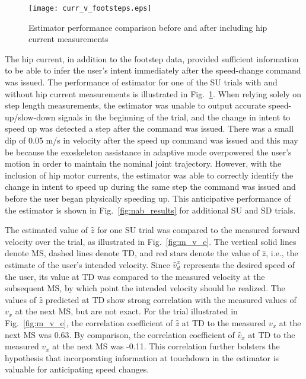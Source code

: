 \begin{figure}
	\centering
	\texttt{[image: curr\_v\_footsteps.eps]}
	\caption{Estimator performance comparison before and after including hip current measurements} \label{fig:c_v_f}
\end{figure}

The hip current, in addition to the footstep data, provided sufficient information to be able to infer the user's intent immediately after the speed-change command was issued.
The performance of estimator for one of the SU trials with and without hip current measurements is illustrated in Fig.~\ref{fig:c_v_f}. When relying solely on step length measurements, the estimator was unable to output accurate speed-up/slow-down signals in the beginning of the trial, and the change in intent to speed up was detected a step after the command was issued. There was a small dip of 0.05 m/s in velocity after the speed up command was issued and this may be because the exoskeleton assistance in adaptive mode overpowered the user's motion in order to maintain the nominal joint trajectory. However, with the inclusion of hip motor currents, the estimator was able to correctly identify the change in intent to speed up during the same step the command was issued and before the user began physically speeding up. This anticipative performance of the estimator is shown in Fig.~\ref{fig:nab_results} for additional SU and SD trials. 

The estimated value of $ \hat{z} $ for one SU trial was compared to the measured forward velocity over the trial, as illustrated in Fig.~\ref{fig:m_v_e}. The vertical solid lines denote MS, dashed lines denote TD, and red stars denote the value of $ \hat{z} $, i.e., the estimate of the user's intended velocity. Since $\hat{v}^x_d$ represents the desired speed of the user, its value at TD was compared to the measured velocity at the subsequent MS, by which point the intended velocity should be realized. The values of $ \hat{z} $ predicted at TD show strong correlation with the measured values of $v_x$ at the next MS, but are not exact. For the trial illustrated in Fig.~\ref{fig:m_v_e}, the correlation coefficient of $ \hat{z} $ at TD to the measured $ v_x $ at the next MS was 0.63. By comparison, the correlation coefficient of $ \hat{v}_x $ at TD to the measured $ v_x $ at the next MS was -0.11. This correlation further bolsters the hypothesis that incorporating information at touchdown in the estimator is valuable for anticipating speed changes.

